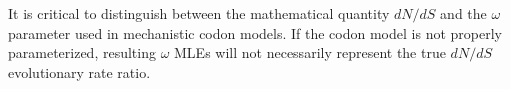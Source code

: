 \documentclass[11pt]{article}
\begin{document}
It is critical to distinguish between the mathematical quantity $dN/dS$ and the $\omega$ parameter used in mechanistic codon models. If the codon model is not properly parameterized, resulting $\omega$ MLEs will not necessarily represent the true $dN/dS$ evolutionary rate ratio.





\end{document}
